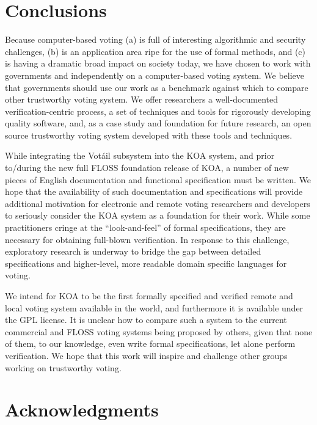 \documentclass[letterpaper,twocolumn,10pt]{article}
\newcommand{\Votail}{Vot{\'a}il\xspace}
\begin{document}
\section{Conclusions}
\label{sec:conclusions}

Because computer-based voting (a) is full of interesting algorithmic
and security challenges, (b) is an application area ripe for the use
of formal methods, and (c) is having a dramatic broad impact on
society today, we have chosen to work with governments and
independently on a computer-based voting system.  We believe that
governments should use our work as a benchmark against which to
compare other trustworthy voting system.  We offer researchers a
well-documented verification-centric process, a set of techniques and
tools for rigorously developing quality software, and, as a case study
and foundation for future research, an open source trustworthy voting
system developed with these tools and techniques.

While integrating the \Votail subsystem into the KOA system, and prior
to/during the new full FLOSS foundation release of KOA, a number of
new pieces of English documentation and functional specification must
be written.  We hope that the availability of such documentation and
specifications will provide additional motivation for electronic and
remote voting researchers and developers to seriously consider the KOA
system as a foundation for their work.  While some practitioners
cringe at the ``look-and-feel'' of formal specifications, they are
necessary for obtaining full-blown verification.  In response to this
challenge, exploratory research is underway to bridge the gap between
detailed specifications and higher-level, more readable domain specific
languages for voting.

We intend for KOA to be the first formally specified and verified
remote and local voting system available in the world, and furthermore
it is available under the GPL license.  It is unclear how to
compare such a system to the current commercial and FLOSS voting
systems being proposed by others, given that none of them, to our
knowledge, even write formal specifications, let alone perform
verification.  We hope that this work will inspire and challenge other
groups working on trustworthy voting.

\section{Acknowledgments}
\end{document}
